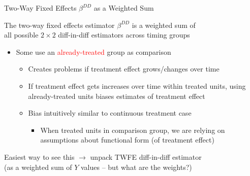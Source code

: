 \documentclass[10pt,xcolor=table,ignorenonframetext,handout,aspectratio=169]{beamer}
\newlength{\wideitemsep}
\let\olditem\item
\renewcommand{\item}{\setlength{\itemsep}{\wideitemsep}\olditem}
\begin{document}
\newpage
\begin{frame}{Two-Way Fixed Effects $\beta^{DD}$ as a Weighted Sum}

\medskip
The two-way fixed effects estimator $\beta^{DD}$ is a weighted sum of \\
all possible $2\times2$ diff-in-diff estimators across timing groups

\medskip
\begin{itemize}

\item Some use an \textcolor{red}{already-treated} group as comparison

\medskip
\begin{itemize}

\item Creates problems if treatment effect grows/changes over time 

\item If treatment effect gets increases over time within treated units, using already-treated units biases estimates of treatment effect

\item Bias intuitively similar to continuous treatment case 

\medskip
\begin{itemize}

\item When treated units in comparison group, we are relying on assumptions about functional form (of treatment effect) 

\end{itemize} 

\end{itemize} 

\end{itemize} 

\pause
\medskip
\medskip
Easiest way to see this $\rightarrow$ unpack TWFE diff-in-diff estimator \\
(as a weighted sum of $Y$ values -- but what are the weights?)


\end{frame}


\end{document}
